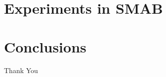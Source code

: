 \documentclass{beamer}
\begin{document}
\section{Experiments in SMAB}


\section{Conclusions}


% 
%



\begin{frame}
\Huge{\centerline{Thank You}}
\end{frame}

\end{document}
